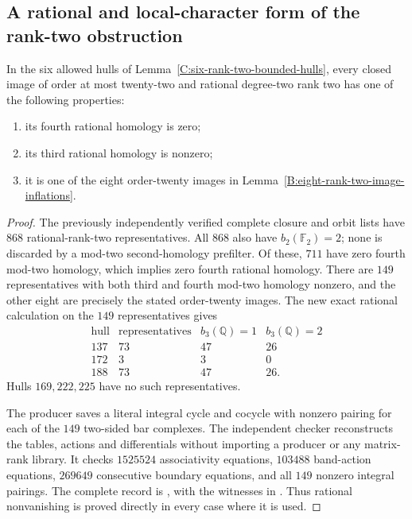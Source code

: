 \subsection{A rational and local-character form of the rank-two obstruction}

\begin{lemma}
\label{B:rank-two-rational-image-gate}
In the six allowed hulls of Lemma~\ref{C:six-rank-two-bounded-hulls},
every closed image of order at most twenty-two and rational
degree-two rank two has one of the following properties:
\begin{enumerate}
\item its fourth rational homology is zero;
\item its third rational homology is nonzero;
\item it is one of the eight order-twenty images in
Lemma~\ref{B:eight-rank-two-image-inflations}.
\end{enumerate}
\end{lemma}
\begin{proof}
The previously independently verified complete closure and orbit
lists have $868$ rational-rank-two representatives. All $868$
also have $b_2(\mathbb F_2)=2$; none is discarded by a
mod-two second-homology prefilter. Of these, $711$ have zero
fourth mod-two homology, which implies zero fourth rational
homology. There are $149$ representatives with both third and
fourth mod-two homology nonzero, and the other eight are precisely
the stated order-twenty images. The new exact rational calculation
on the $149$ representatives gives
\[
\begin{array}{c|r|r|r}
 \text{hull}&\text{representatives}&b_3(\mathbb Q)=1&b_3(\mathbb Q)=2\\\hline
 137&73&47&26\\
 172&3&3&0\\
 188&73&47&26.
\end{array}
\]
Hulls $169,222,225$ have no such representatives.

The producer  saves a literal
integral cycle and cocycle with nonzero pairing for each of the
$149$ two-sided bar complexes. The independent checker
 reconstructs the
tables, actions and differentials without importing a producer
or any matrix-rank library. It checks $1525524$ associativity
equations, $103488$ band-action equations, $269649$ consecutive
boundary equations, and all $149$ nonzero integral pairings.
The complete record is
,
with the witnesses in
.
Thus rational nonvanishing is proved directly in every case
where it is used.
\end{proof}

